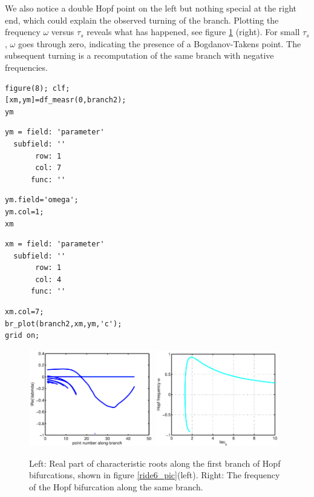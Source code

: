 \documentclass[10pt]{scrartcl}
\begin{document}
We also notice a double Hopf point on the left but nothing special at the
right end, which could explain the observed turning of the branch.
Plotting the frequency $\omega$ versus $\tau_s$ reveals what has happened,
see figure \ref{ride7+8_pic} (right).
For small $\tau_s$, $\omega$ goes through zero, indicating the presence
of a Bogdanov-Takens point. The subsequent turning is a recomputation
of the same branch with negative frequencies.
\begin{lstlisting}
figure(8); clf;
[xm,ym]=df_measr(0,branch2);
ym
\end{lstlisting}
{\small
\begin{verbatim}
ym = field: 'parameter'
  subfield: ''
       row: 1
       col: 7
      func: ''
\end{verbatim}}
\begin{lstlisting}
ym.field='omega';
ym.col=1;
xm
\end{lstlisting}
{\small
\begin{verbatim}
xm = field: 'parameter'
  subfield: ''
       row: 1
       col: 4
      func: ''
\end{verbatim}}
\begin{lstlisting}
xm.col=7;
br_plot(branch2,xm,ym,'c');  
grid on;
\end{lstlisting}
\begin{figure}[h]
\begin{center}
\includegraphics[width=0.48\textwidth]{fig/demo1fig07}
\includegraphics[width=0.48\textwidth]{fig/demo1fig08}
\end{center}
\caption{\label{ride7+8_pic}Left: Real part of characteristic roots
  along the first branch of Hopf bifurcations, shown in figure
  \ref{ride6_pic}(left). Right: The frequency of the Hopf
  bifurcation along the same branch.}
\end{figure}
\end{document}

